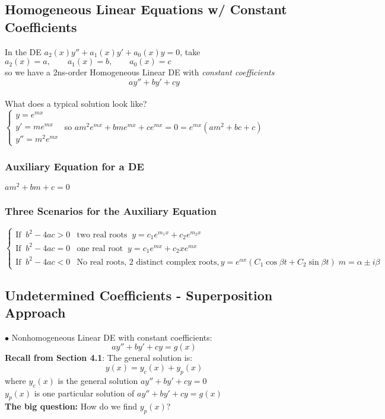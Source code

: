 \documentclass{article}
\begin{document}
\subsection{Homogeneous Linear Equations w/ Constant Coefficients}
In the DE $a_2(x)y''+a_1(x)y'+a_0(x)y=0$, take \\
$a_2(x)=a,\qquad a_1(x)=b,\qquad a_0(x)=c$
\\ so we have a 2ns-order Homogeneous Linear DE with \textit{constant coefficients}
$$ay''+by'+cy$$
\\What does a typical solution look like?
\\$\begin{cases}
    y=e^{mx}
    \\y'=me^{mx}
    \\y''=m^2e^{mx}
\end{cases}$ so $am^2e^{mx}+bme^{mx}+ce^{mx}=0=e^{mx}(am^2+bc+c)$
\subsubsection{Auxiliary Equation for a DE} $am^2+bm+c=0$
\subsubsection{Three Scenarios for the Auxiliary Equation}
$\begin{cases}
    \text{If}\;\; b^2-4ac>0 & \text{two real roots}\;\; y=c_1e^{m_1x}+c_2e^{m_2x}
    \\ \text{If}\;\; b^2-4ac=0 & \text{one real root}\;\; y=c_1e^{mx}+c_2xe^{mx}
    \\\text{If}\;\; b^2-4ac<0 & \text{No real roots, 2 distinct complex roots}, y=e^{\alpha x}\left(C_1\cos \beta t +C_2\sin \beta t\right)\; m=\alpha \pm i\beta
\end{cases}$
\subsection{Undetermined Coefficients - Superposition Approach}
$\bullet$ Nonhomogeneous Linear DE with constant coefficients:
$$ay''+by'+cy=g(x)$$
\textbf{Recall from Section 4.1}: The general solution is: $$y(x)=y_c(x)+y_p(x)$$ where $y_c(x)$ is the general solution $ay''+by'+cy=0$\\ $y_p(x)$ is one particular solution of $ay''+by'+cy=g(x)$
\\\textbf{The big question:} How do we find $y_p(x)$?
\end{document}
